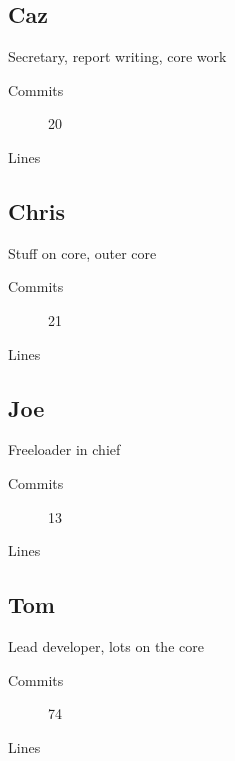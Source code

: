   \subsection{Caz}
    Secretary, report writing, core work
    \begin{description}
      \item[Commits] 20
      \item[Lines]
    \end{description}

  \subsection{Chris}
    Stuff on core, outer core
    \begin{description}
      \item[Commits] 21
      \item[Lines]
    \end{description}

  \subsection{Joe}
    Freeloader in chief
    \begin{description}
      \item[Commits] 13
      \item[Lines]
    \end{description}

  \subsection{Tom}
    Lead developer, lots on the core
    \begin{description}
      \item[Commits] 74
      \item[Lines]
    \end{description}

